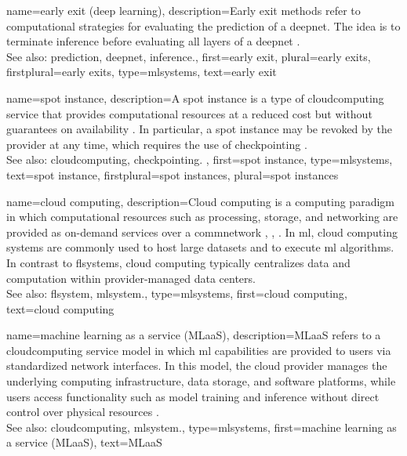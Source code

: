 {name={early exit (deep learning)},
	description={Early exit methods refer to 
		computational strategies for evaluating the \gls{prediction} of a 
		\gls{deepnet}. The idea is to terminate \gls{inference} before evaluating 
		all \glspl{layer} of a \gls{deepnet} \cite{Teerapittayanon2016}.
		\\
		See also: \gls{prediction}, \gls{deepnet}, \gls{inference}.}, 
	first={early exit},
	plural={early exits},
	firstplural={early exits},
	type=mlsystems,
	text={early exit}
}

{name={spot instance},
	description={A spot instance is a 
		type of \gls{cloudcomputing} service that 
		provides computational resources at a reduced cost but 
		without guarantees on availability \cite{Mazzucco2011}.
		In particular, a spot instance may be revoked by the provider 
		at any time, which requires the use of \gls{checkpointing} \cite{Khatua2013}.
		\\
		See also: \gls{cloudcomputing}, \gls{checkpointing}. }, 
	first={spot instance},
	type=mlsystems,
	text={spot instance},
	firstplural={spot instances},
	plural={spot instances}
}

{name={cloud computing},
	description={Cloud computing is a computing paradigm in which 
		computational resources such as processing, storage, and networking are provided 
		as on-demand services over a \gls{commnetwork}
		\cite{DistributedSystems}, \cite{ComerCloudComputing2021}, \cite{Armbrust2010}. 
		In \gls{ml}, cloud computing systems are commonly used to host large \glspl{dataset} 
		and to execute \gls{ml} \glspl{algorithm}. In contrast to \glspl{flsystem}, cloud 
		computing typically centralizes \gls{data} and computation within provider-managed 
		\gls{data} centers.
		\\
		See also: \gls{flsystem}, \gls{mlsystem}.},
	type=mlsystems,
	first={cloud computing},
	text={cloud computing}
}

{name={machine learning as a service (MLaaS)},
	description={MLaaS refers to a 
		\gls{cloudcomputing} service \gls{model} in which \gls{ml} 
		capabilities are provided to users via standardized network interfaces. 
		In this \gls{model}, the cloud provider manages the underlying computing 
		infrastructure, \gls{data} storage, and software platforms, while users 
		access functionality such as \gls{model} \gls{training} and \gls{inference} 
		without direct control over physical resources \cite{ComerCloudComputing2021}.
				 \\
		See also: \gls{cloudcomputing}, \gls{mlsystem}.},
	type=mlsystems,
	first={machine learning as a service (MLaaS)},
	text={MLaaS}
}

